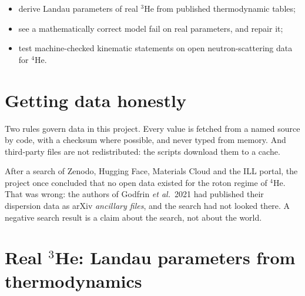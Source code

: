 \documentclass[11pt,a4paper,openany]{book}
\theoremstyle{definition}
\theoremstyle{plain}
\begin{document}
\begin{objectives}
\begin{itemize}
  \item derive Landau parameters of real $^3$He from published thermodynamic tables;
  \item see a mathematically correct model fail on real parameters, and repair it;
  \item test machine-checked kinematic statements on open neutron-scattering data for $^4$He.
\end{itemize}
\end{objectives}

\section{Getting data honestly}

Two rules govern data in this project. Every value is fetched from a named source by code, with a
checksum where possible, and never typed from memory. And third-party files are not redistributed:
the scripts download them to a cache.

\begin{lesson}
After a search of Zenodo, Hugging Face, Materials Cloud and the ILL portal, the project once
concluded that no open data existed for the roton regime of $^4$He. That was wrong: the authors
of Godfrin \emph{et al.}\ 2021 \cite{godfrin2021} had published their dispersion data as arXiv
\emph{ancillary files}, and the search had not looked there. A negative search result is a claim
about the search, not about the world.
\end{lesson}

\section{Real \texorpdfstring{$^3$He}{3He}: Landau parameters from thermodynamics}
\end{document}
